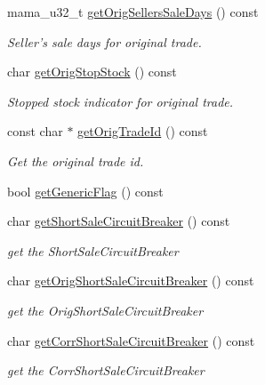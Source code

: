 \begin{CompactItemize}
mama\_\-u32\_\-t \hyperlink{classWombat_1_1MamdaTradeListener_7020c24d5e41e1a14734ffd8673ac860}{get\-Orig\-Sellers\-Sale\-Days} () const 
\begin{CompactList}\small\item\em Seller's sale days for original trade. \item\end{CompactList}\item 
char \hyperlink{classWombat_1_1MamdaTradeListener_4a5498e32feec686f6989e3ced92a984}{get\-Orig\-Stop\-Stock} () const 
\begin{CompactList}\small\item\em Stopped stock indicator for original trade. \item\end{CompactList}\item 
const char $\ast$ \hyperlink{classWombat_1_1MamdaTradeListener_f63f45ca9303c611b885390a012d6b87}{get\-Orig\-Trade\-Id} () const 
\begin{CompactList}\small\item\em Get the original trade id. \item\end{CompactList}\item 
bool \hyperlink{classWombat_1_1MamdaTradeListener_f6591781ca46aa1392877bbf12c9e2f5}{get\-Generic\-Flag} () const 
\item 
char \hyperlink{classWombat_1_1MamdaTradeListener_8d5969ac94475afb4eeeb8b252106e6f}{get\-Short\-Sale\-Circuit\-Breaker} () const 
\begin{CompactList}\small\item\em get the Short\-Sale\-Circuit\-Breaker \item\end{CompactList}\item 
char \hyperlink{classWombat_1_1MamdaTradeListener_faa29432bc36076ea95e370398b3cbae}{get\-Orig\-Short\-Sale\-Circuit\-Breaker} () const 
\begin{CompactList}\small\item\em get the Orig\-Short\-Sale\-Circuit\-Breaker \item\end{CompactList}\item 
char \hyperlink{classWombat_1_1MamdaTradeListener_e7d9e2149cece7e7af95aaf102623d91}{get\-Corr\-Short\-Sale\-Circuit\-Breaker} () const 
\begin{CompactList}\small\item\em get the Corr\-Short\-Sale\-Circuit\-Breaker \item\end{CompactList}\item 

\end{CompactItemize}
